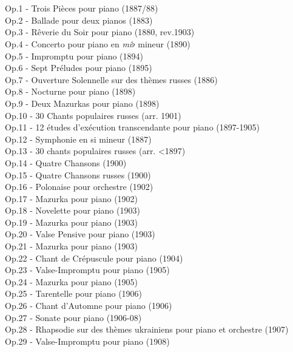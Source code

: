 \\
\\
Op.1 - Trois Pièces pour piano (1887/88)\\
Op.2 - Ballade pour deux pianos (1883)\\
Op.3 - Rêverie du Soir pour piano (1880, rev.1903)\\
Op.4 - Concerto pour piano  en \emph{mi}$\flat$ mineur (1890)\\
Op.5 - Impromptu pour piano (1894)\\
Op.6 - Sept Préludes pour piano (1895)\\
Op.7 - Ouverture Solennelle sur des thèmes russes (1886)\\
Op.8 - Nocturne pour piano (1898)\\
Op.9 - Deux Mazurkas pour piano (1898)\\
Op.10 - 30 Chants populaires russes (arr. 1901)\\
Op.11 - 12 études d'exécution transcendante pour piano (1897-1905)\\
Op.12 - Symphonie  en si mineur (1887)\\
Op.13 - 30 chants populaires russes (arr. <1897)\\
Op.14 - Quatre Chansons (1900)\\
Op.15 - Quatre Chansons russes (1900)\\
Op.16 - Polonaise pour orchestre (1902)\\
Op.17 - Mazurka  pour piano (1902)\\
Op.18 - Novelette pour piano (1903)\\
Op.19 - Mazurka  pour piano (1903)\\
Op.20 - Valse Pensive pour piano (1903)\\
Op.21 - Mazurka  pour piano (1903)\\
Op.22 - Chant de Crépuscule pour piano (1904)\\
Op.23 - Valse-Impromptu  pour piano (1905)\\
Op.24 - Mazurka  pour piano (1905)\\
Op.25 - Tarentelle pour piano (1906)\\
Op.26 - Chant d'Automne pour piano (1906)\\
Op.27 - Sonate pour piano (1906-08)\\
Op.28 - Rhapsodie sur des thèmes ukrainiens pour piano et orchestre (1907)\\
Op.29 - Valse-Impromptu  pour piano (1908)\\
